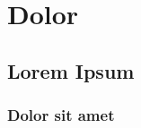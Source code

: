 \chapter{Dolor}\label{ch:dolor}

\lipsum[1]

\section{Lorem Ipsum}\label{sec:lorem-ipsum2}

    \lipsum[2-4]

    \subsection{Dolor sit amet}\label{subsec:dolor-sit-amet2}

        \lipsum[5-11]